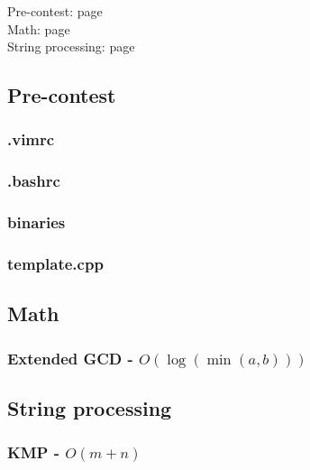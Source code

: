 \documentclass[landscape,a4paper,twocolumn,10pt]{report}
\begin{document}
\footnotesize

\noindent
Pre-contest: page \pageref{precontest} \\
Math: page \pageref{math} \\
String processing: page \pageref{string}



\subsection*{Pre-contest}
\label{precontest}

\subsubsection{.vimrc}


\subsubsection*{.bashrc}


\subsubsection*{binaries}


\subsubsection{template.cpp}




\subsection*{Math}
\label{math}

\subsubsection{Extended GCD - $O(\log(\min(a, b)))$}




\subsection*{String processing}
\label{string}

\subsubsection{KMP - $O(m+n)$}




\label{LastPage}
\end{document}
